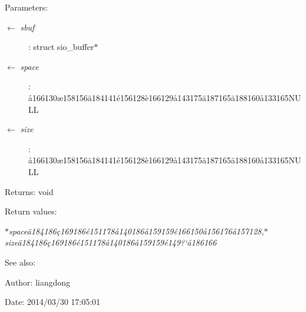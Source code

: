 \begin{Desc}
\item[Parameters:]
\begin{description}
\item[\mbox{$\leftarrow$} {\em sbuf}]: struct sio\_\-buffer$\ast$ \item[\mbox{$\leftarrow$} {\em space}]: \aa{}166130\ae{}158156\"{a}184141\'{e}156128\`{e}166129\aa{}143175\"{a}187165\"{a}188160\aa{}133165NULL \item[\mbox{$\leftarrow$} {\em size}]: \aa{}166130\ae{}158156\"{a}184141\'{e}156128\`{e}166129\aa{}143175\"{a}187165\"{a}188160\aa{}133165NULL \end{description}
\end{Desc}
\begin{Desc}
\item[Returns:]void \end{Desc}
\begin{Desc}
\item[Return values:]
\begin{description}
\item[{\em $\ast$space\"{a}184186\c{c}169186\'{e}151178\aa{}140186\aa{}159159\'{e}166150\aa{}156176\aa{}157128,$\ast$size\"{a}184186\c{c}169186\'{e}151178\aa{}140186\aa{}159159\'{e}149?`\aa{}186166}]\end{description}
\end{Desc}
\begin{Desc}
\item[See also:]\end{Desc}
\begin{Desc}
\item[Author:]liangdong \end{Desc}
\begin{Desc}
\item[Date:]2014/03/30 17:05:01 \end{Desc}
